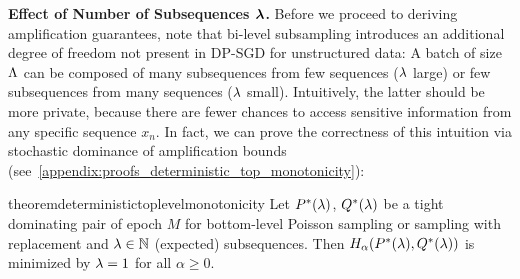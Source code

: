 \textbf{Effect of Number of Subsequences $\bm{\lambda}$.}
Before we proceed to deriving amplification guarantees, 
note that  bi-level subsampling introduces an additional degree of freedom not  present in DP-SGD for unstructured data:
A batch of size $\Lambda$ can be composed of many subsequences from few sequences ($\lambda$ large)
or few subsequences from many sequences ($\lambda$ small).
Intuitively, the latter should be more private, because there are fewer chances to access  sensitive information from any  specific sequence $x_n$. 
In fact, we can prove the correctness of this intuition
via stochastic dominance of amplification bounds   (see~\cref{appendix:proofs_deterministic_top_monotonicity}):
\begin{restatable}{theorem}{deterministictoplevelmonotonicity}\label{proposition:deterministic_top_level_monotonicity}
    Let $P^{*}(\lambda)$, $Q^{*}(\lambda)$ be a tight dominating pair of epoch $M$ for bottom-level Poisson sampling or sampling with replacement and $\lambda \in {\mathbb{N}}$ (expected) subsequences.
    Then $H_\alpha(P^{*}(\lambda), Q^{*}(\lambda))$ is minimized by $\lambda = 1$ for all $\alpha \geq 0$.
\end{restatable}

